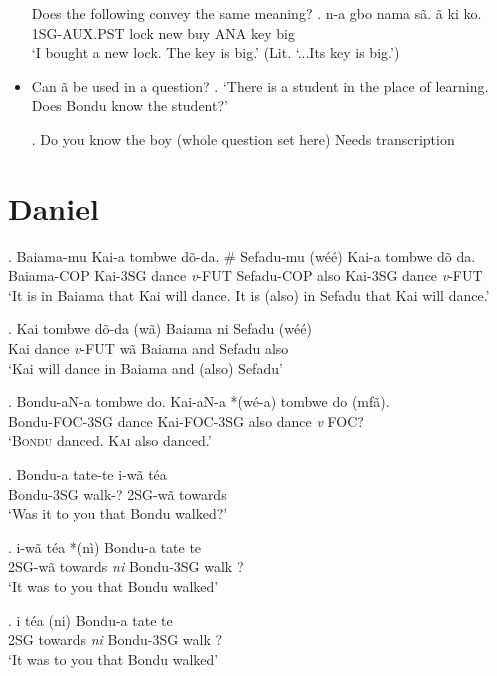 \documentclass{assets/fieldnotes}
\begin{document}
\begin{itemize}
    Does the following convey the same meaning?
     \exg. n-a gbo nama sã. ã ki ko.\\
        1SG-AUX.PST lock new buy ANA key big\\
        `I bought a new lock. The key is big.' (Lit. `...Its key is big.')

    \item Can ã be used in a question?
    \ex. `There is a student in the place of learning. Does Bondu know the student?'

\ex. Do you know the boy (whole question set here)
{Needs transcription}
    
\end{itemize}


\section{Daniel}
\exg. Baiama-mu Kai-a tombwe dõ-da. \# Sefadu-mu (wéé) Kai-a tombwe dõ da.\\
Baiama-COP Kai-3SG dance \textit{v}-FUT {} Sefadu-COP also Kai-3SG dance \textit{v}-FUT\\
`It is in Baiama that Kai will dance. It is (also) in Sefadu that Kai will dance.'

\exg. Kai tombwe dõ-da (wã) Baiama ni Sefadu (wéé)\\
Kai dance \textit{v}-FUT wã Baiama and Sefadu also\\
`Kai will dance in Baiama and (also) Sefadu'

\exg. Bondu-aN-a tombwe do. Kai-aN-a *(wé-a) tombwe do (mfã).\\
Bondu-FOC-3SG dance  Kai-FOC-3SG also dance \textit{v} FOC?\\
`\textsc{Bondu} danced. \textsc{Kai} also danced.'

\exg. Bondu-a tate-te i-wã téa\\
Bondu-3SG walk-? 2SG-wã towards\\
`Was it to you that Bondu walked?'

\exg. i-wã téa *(nì) Bondu-a tate te\\
2SG-wã towards \textit{ni} Bondu-3SG walk ?\\
`It was to you that Bondu walked'

\exg. i téa (ni) Bondu-a tate te\\
2SG towards \textit{ni} Bondu-3SG walk ?\\
`It was to you that Bondu walked'
\end{document}
